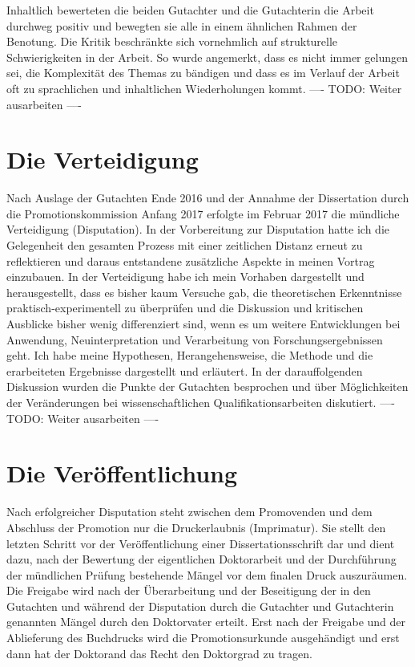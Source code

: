 Inhaltlich bewerteten die beiden Gutachter und die Gutachterin die Arbeit durchweg positiv und bewegten sie alle in einem ähnlichen Rahmen der Benotung. Die Kritik beschränkte sich vornehmlich auf strukturelle Schwierigkeiten in der Arbeit. So wurde angemerkt, dass es nicht immer gelungen sei, die Komplexität des Themas zu bändigen und dass es im Verlauf der Arbeit oft zu sprachlichen und inhaltlichen Wiederholungen kommt. ---- TODO: Weiter ausarbeiten ----

\section{Die Verteidigung}

Nach Auslage der Gutachten Ende 2016 und der Annahme der Dissertation durch die Promotionskommission Anfang 2017 erfolgte im Februar 2017 die mündliche Verteidigung (Disputation). In der Vorbereitung zur Disputation hatte ich die Gelegenheit den gesamten Prozess mit einer zeitlichen Distanz erneut zu reflektieren und daraus entstandene zusätzliche Aspekte in meinen Vortrag einzubauen. In der Verteidigung habe ich mein Vorhaben dargestellt und herausgestellt, dass es bisher kaum Versuche gab, die theoretischen Erkenntnisse praktisch-experimentell zu überprüfen und die Diskussion und kritischen Ausblicke bisher wenig differenziert sind, wenn es um weitere Entwicklungen bei Anwendung, Neuinterpretation und Verarbeitung von Forschungsergebnissen geht. Ich habe meine Hypothesen, Herangehensweise, die Methode und die erarbeiteten Ergebnisse dargestellt und erläutert. In der darauffolgenden Diskussion wurden die Punkte der Gutachten besprochen und über Möglichkeiten der Veränderungen bei wissenschaftlichen Qualifikationsarbeiten diskutiert. ---- TODO: Weiter ausarbeiten ----

\section{Die Veröffentlichung}

Nach erfolgreicher Disputation steht zwischen dem Promovenden und dem Abschluss der Promotion nur die Druckerlaubnis (Imprimatur). Sie stellt den letzten Schritt vor der Veröffentlichung einer Dissertationsschrift dar und dient dazu, nach der Bewertung der eigentlichen Doktorarbeit und der Durchführung der mündlichen Prüfung bestehende Mängel vor dem finalen Druck auszuräumen. Die Freigabe wird nach der Überarbeitung und der Beseitigung der in den Gutachten und während der Disputation durch die Gutachter und Gutachterin genannten Mängel durch den Doktorvater erteilt. Erst nach der Freigabe und der Ablieferung des Buchdrucks wird die Promotionsurkunde ausgehändigt und erst dann hat der Doktorand das Recht den Doktorgrad zu tragen.

